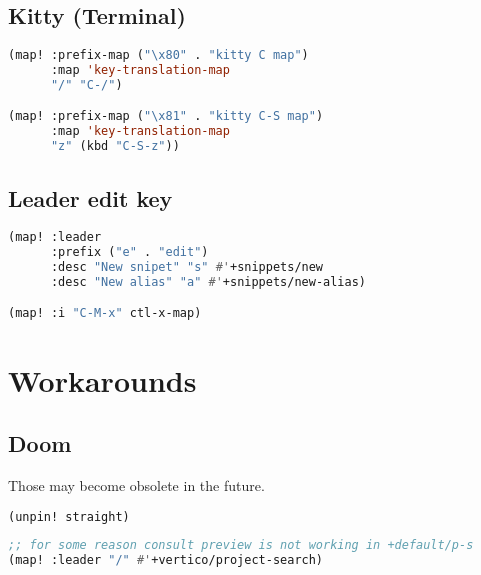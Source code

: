 \documentclass[11pt]{article}
\begin{document}
\subsection{Kitty (Terminal)}
\label{sec:kitty-terminal}
\begin{lstlisting}[language=Lisp]
(map! :prefix-map ("\x80" . "kitty C map")
      :map 'key-translation-map
      "/" "C-/")

(map! :prefix-map ("\x81" . "kitty C-S map")
      :map 'key-translation-map
      "z" (kbd "C-S-z"))
\end{lstlisting}

\subsection{Leader edit key}
\label{sec:leader-edit-key}
\begin{lstlisting}[language=Lisp]
(map! :leader
      :prefix ("e" . "edit")
      :desc "New snipet" "s" #'+snippets/new
      :desc "New alias" "a" #'+snippets/new-alias)

(map! :i "C-M-x" ctl-x-map)
\end{lstlisting}


\section{Workarounds}
\label{sec:workarounds-1}


\subsection{Doom}
\label{sec:doom}
Those may become obsolete in the future.

\begin{lstlisting}[language=Lisp]
(unpin! straight)
\end{lstlisting}

\begin{lstlisting}[language=Lisp]
;; for some reason consult preview is not working in +default/p-s 
(map! :leader "/" #'+vertico/project-search)
\end{lstlisting}
\end{document}
